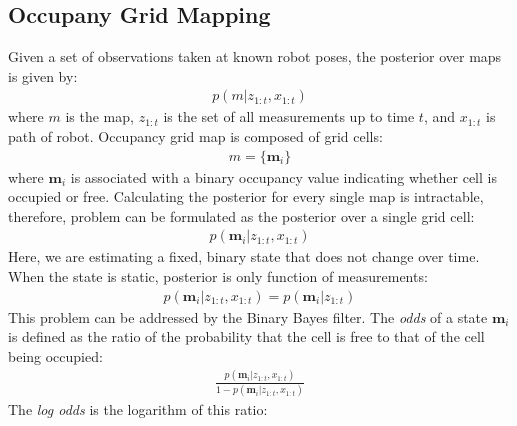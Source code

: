 \documentclass[letterpaper, 10 pt, conference]{ieeeconf}  %
\begin{document}
\subsection{Occupany Grid Mapping}
Given a set of observations taken at known robot poses, the posterior over maps is given by:
\begin{align}
    p(m | z_{1:t},x_{1:t})
\end{align}
\noindent where $m$ is the map, $z_{1:t}$ is the set of all measurements up to time $t$, and $x_{1:t}$ is path of robot. 
Occupancy grid map is composed of grid cells:
\begin{align}
    m = \{\textbf{m}_i\}
\end{align}
\noindent where $\textbf{m}_i$ is associated with a binary occupancy value indicating whether cell is occupied or free. Calculating the posterior for every single map is intractable, therefore, problem can be formulated as the posterior over a single grid cell: 
\begin{align}
    p(\textbf{m}_i | z_{1:t},x_{1:t})
\end{align}
Here, we are estimating a fixed, binary state that does not change over time. When the state is static, posterior is only function of measurements:
\begin{align}
    p(\textbf{m}_i | z_{1:t},x_{1:t}) = p(\textbf{m}_i | z_{1:t})
    \label{static}
\end{align}
This problem can be addressed by the Binary Bayes filter. The \emph{odds} of a state $\textbf{m}_i$ is defined as the ratio of the probability that the cell is free to that of the cell being occupied:
\begin{align}
    \frac{p(\textbf{m}_i | z_{1:t},x_{1:t})}{1-p(\textbf{m}_i | z_{1:t},x_{1:t})}
    \label{odd}
\end{align}
The \emph{log odds} is the logarithm of this ratio:
\end{document}
